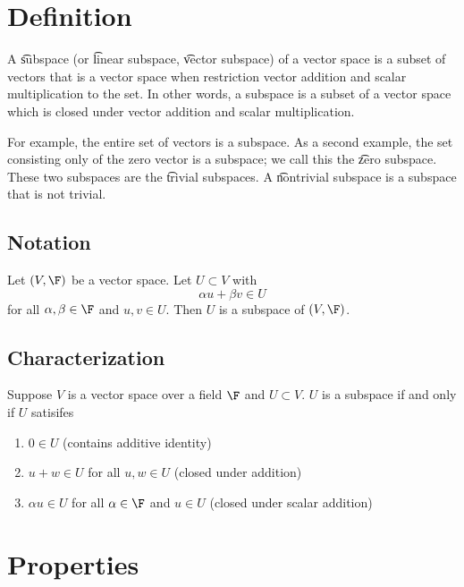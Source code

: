 
\section*{Definition}

A \t{subspace} (or \t{linear subspace}, \t{vector subspace}) of a vector space is a subset of vectors that is a vector space when restriction vector addition and scalar multiplication to the set.
In other words, a subspace is a subset of a vector space which is closed under vector addition and scalar multiplication.

For example, the entire set of vectors is a subspace.
As a second example, the set consisting only of the zero vector is a subspace; we call this the \t{zero subspace}.
These two subspaces are the \t{trivial subspaces}.
A \t{nontrivial subspace} is a subspace that is not trivial.

\subsection*{Notation}

Let $(V, \F )$ be a vector space.
Let $U \subset V$ with
\[
\alpha  u + \beta  v \in U
\]
for all $\alpha , \beta  \in \F $ and $u, v \in U$.
Then $U$ is a subspace of $(V, \F )$.

\subsection*{Characterization}


\begin{proposition}
Suppose $V$ is a vector space over a field $\F $ and $U \subset V$.
$U$ is a subspace if and only if $U$ satisifes
  \begin{enumerate}
    \item $0 \in U$ (contains additive identity)
    \item $u + w \in U$ for all $u, w \in U$ (closed under addition)
    \item $\alpha u \in U$ for all $\alpha  \in \F $ and $u \in U$ (closed under scalar addition)
  \end{enumerate}
\end{proposition}

\section*{Properties}

